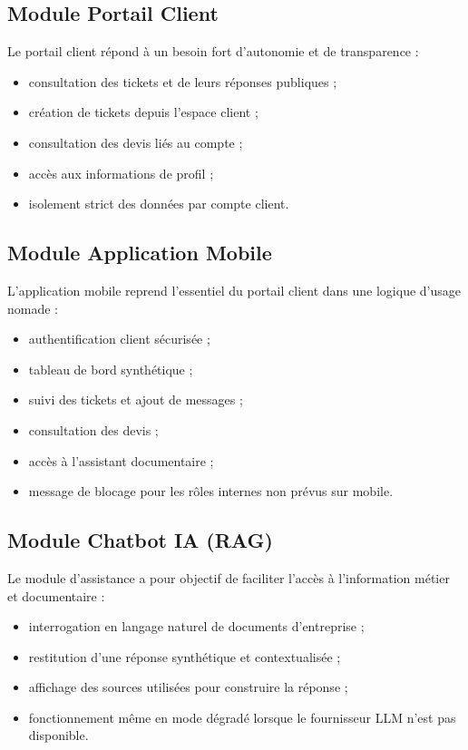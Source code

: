 \subsection{Module Portail Client}
Le portail client répond à un besoin fort d'autonomie et de transparence :
\begin{itemize}
    \item consultation des tickets et de leurs réponses publiques ;
    \item création de tickets depuis l'espace client ;
    \item consultation des devis liés au compte ;
    \item accès aux informations de profil ;
    \item isolement strict des données par compte client.
\end{itemize}

\subsection{Module Application Mobile}
L'application mobile reprend l'essentiel du portail client dans une logique d'usage nomade :
\begin{itemize}
    \item authentification client sécurisée ;
    \item tableau de bord synthétique ;
    \item suivi des tickets et ajout de messages ;
    \item consultation des devis ;
    \item accès à l'assistant documentaire ;
    \item message de blocage pour les rôles internes non prévus sur mobile.
\end{itemize}

\subsection{Module Chatbot IA (RAG)}
Le module d'assistance a pour objectif de faciliter l'accès à l'information métier et documentaire :
\begin{itemize}
    \item interrogation en langage naturel de documents d'entreprise ;
    \item restitution d'une réponse synthétique et contextualisée ;
    \item affichage des sources utilisées pour construire la réponse ;
    \item fonctionnement même en mode dégradé lorsque le fournisseur LLM n'est pas disponible.
\end{itemize}

